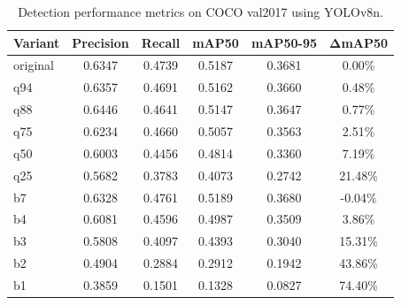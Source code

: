 \documentclass[12pt, a4paper]{article}
\begin{document}
\begin{table}[t]
\centering
\caption{Detection performance metrics on COCO val2017 using YOLOv8n.}
\label{tab:results_perf}

\begin{tabular}{|l|c|c|c|c|c|}
\hline
\textbf{Variant} & \textbf{Precision} & \textbf{Recall} & \textbf{mAP50} & \textbf{mAP50-95} & $\boldsymbol{\Delta}$\textbf{mAP50} \\ \hline

original & 0.6347 & 0.4739 & 0.5187 & 0.3681 & 0.00\% \\ \hline
q94 & 0.6357 & 0.4691 & 0.5162 & 0.3660 & 0.48\% \\ \hline
q88 & 0.6446 & 0.4641 & 0.5147 & 0.3647 & 0.77\% \\ \hline
q75 & 0.6234 & 0.4660 & 0.5057 & 0.3563 & 2.51\% \\ \hline
q50 & 0.6003 & 0.4456 & 0.4814 & 0.3360 & 7.19\% \\ \hline
q25 & 0.5682 & 0.3783 & 0.4073 & 0.2742 & 21.48\% \\ \hline
b7 & 0.6328 & 0.4761 & 0.5189 & 0.3680 & -0.04\% \\ \hline
b4 & 0.6081 & 0.4596 & 0.4987 & 0.3509 & 3.86\% \\ \hline
b3 & 0.5808 & 0.4097 & 0.4393 & 0.3040 & 15.31\% \\ \hline
b2 & 0.4904 & 0.2884 & 0.2912 & 0.1942 & 43.86\% \\ \hline
b1 & 0.3859 & 0.1501 & 0.1328 & 0.0827 & 74.40\% \\ \hline

\end{tabular}
\end{table}
\end{document}

